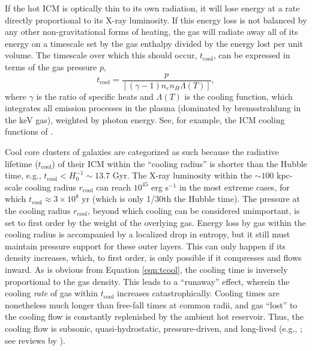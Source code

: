 If the hot ICM is optically thin to its own radiation, it will lose energy 
at a rate directly proportional to its X-ray luminosity. If this energy loss 
is not balanced by any other non-gravitational forms of heating, the gas will 
radiate away all of its energy on a timescale set by the gas enthalpy divided by 
the energy lost per unit volume. The timescale over which this should occur, $t_\mathrm{cool}$, can be expressed in terms of the gas pressure $p$, 
\begin{equation}
t_\mathrm{cool} = \frac{p}{\left[\left(\gamma -1   \right)  n_e n_H \Lambda\left(T\right) \right]},
\label{eqn:tcool}
\end{equation}
where $\gamma$ is the ratio of specific heats and $\Lambda\left(T\right)$ is the cooling function,
which integrates all emission processes in the plasma (dominated by bremsstrahlung in the keV gas), 
weighted by photon energy. See, for example, the ICM cooling functions of \citet{sutherland93,ruszkowski02}. 


Cool core clusters of galaxies are categorized as such because the radiative lifetime ($t_\mathrm{cool}$) of their ICM 
within the ``cooling radius'' is shorter than the Hubble time, e.g., $t_\mathrm{cool} < H_0^{-1}\sim13.7$ Gyr.
The X-ray luminosity within the $\sim 100$ kpc-scale cooling radius $r_\mathrm{cool}$ can reach $10^{45}$ erg s$^{-1}$ 
in the most extreme cases, for which   $t_\mathrm{cool} \approx 3\times10^8$ yr (which is only 1/30th the Hubble time). 
The pressure at the cooling radius $r_\mathrm{cool}$, beyond which cooling can be considered unimportant, 
is set to first order by the weight of the overlying gas. 
Energy loss by gas within the cooling radius is accompanied by a localized drop in entropy, 
but it still must maintain pressure support for these outer layers. This can only happen if its density increases, 
which, to first order, is only possible if it compresses and flows inward. As is obvious from Equation \ref{eqn:tcool}, 
the cooling time is inversely proportional to the gas density. This leads to a ``runaway'' effect, wherein the cooling {\it rate} 
of gas within $t_\mathrm{cool}$ increases catastrophically. 
Cooling times are nonetheless much longer than free-fall times at common radii, 
and gas ``lost'' to the cooling flow is constantly replenished by the ambient hot reservoir. 
Thus, the cooling flow is subsonic, quasi-hydrostatic, pressure-driven, and long-lived (e.g., \citealt{lea73,cowie77,fabian77};
see reviews by \citealt{fabian94,peterson06}).  


